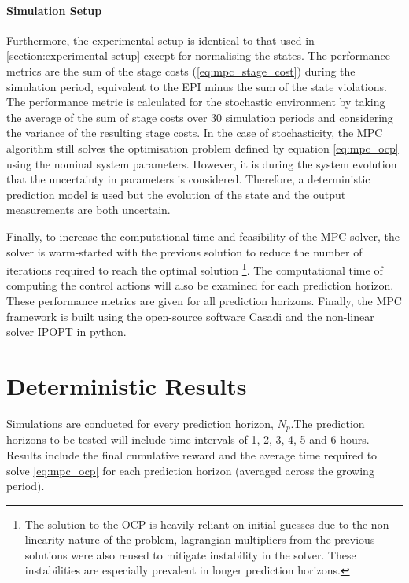 \paragraph{Simulation Setup}
Furthermore, the experimental setup is identical to that used in \autoref{section:experimental-setup} except for normalising the states. The performance metrics are the sum of the stage costs (\autoref{eq:mpc_stage_cost}) during the simulation period, equivalent to the EPI minus the sum of the state violations. The performance metric is calculated for the stochastic environment by taking the average of the sum of stage costs over 30 simulation periods and considering the variance of the resulting stage costs. In the case of stochasticity, the MPC algorithm still solves the optimisation problem defined by equation \autoref{eq:mpc_ocp} using the nominal system parameters. However, it is during the system evolution that the uncertainty in parameters is considered. Therefore, a deterministic prediction model is used but the evolution of the state and the output measurements are both uncertain.

Finally, to increase the computational time and feasibility of the MPC solver, the solver is warm-started with the previous solution to reduce the number of iterations required to reach the optimal solution \footnote{The solution to the OCP is heavily reliant on initial guesses due to the non-linearity nature of the problem, lagrangian multipliers from the previous solutions were also reused to mitigate instability in the solver. These instabilities are especially prevalent in longer prediction horizons.}. The computational time of computing the control actions will also be examined for each prediction horizon. These performance metrics are given for all prediction horizons. Finally, the MPC framework is built using the open-source software Casadi \cite{anderssonCasADiSoftwareFramework2019} and the non-linear solver IPOPT \cite{wachterImplementationInteriorpointFilter2006} in python. 

\section{Deterministic Results}
Simulations are conducted for every prediction horizon, $N_p$.The prediction horizons to be tested will include time intervals of 1, 2, 3, 4, 5 and 6 hours. Results include the final cumulative reward and the average time required to solve \autoref{eq:mpc_ocp} for each prediction horizon (averaged across the growing period).

